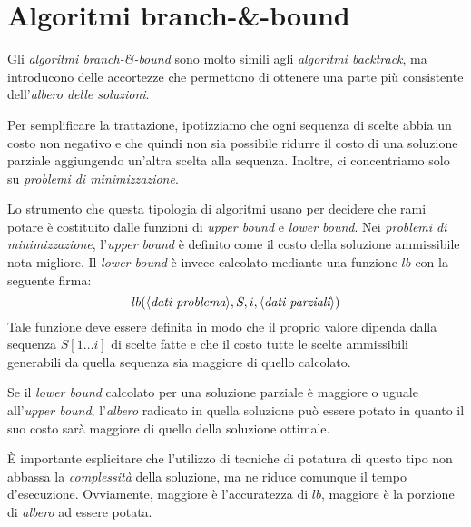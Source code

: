 \section{Algoritmi branch-\&-bound}
Gli \emph{algoritmi branch-\&-bound} sono molto simili agli \emph{algoritmi
backtrack}, ma introducono delle accortezze che permettono di ottenere
 una parte più consistente dell'\emph{albero delle soluzioni}.

\begin{note}
    Per semplificare la trattazione, ipotizziamo che ogni sequenza di scelte
    abbia un costo non negativo e che quindi non sia possibile ridurre il costo
    di una soluzione parziale aggiungendo un'altra scelta alla sequenza.
    Inoltre, ci concentriamo solo su \emph{problemi di minimizzazione}.
\end{note}

\noindent
Lo strumento che questa tipologia di algoritmi usano per decidere che rami potare
è costituito dalle funzioni di \emph{upper bound} e \emph{lower bound}. Nei
\emph{problemi di minimizzazione}, l'\emph{upper bound} è definito come il
costo della soluzione ammissibile nota migliore. Il \emph{lower bound} è invece
calcolato mediante una funzione $lb$ con la seguente firma:
\[lb(\langle\emph{dati problema}\rangle,S,i,\langle\emph{dati parziali}\rangle)\]
Tale funzione deve essere definita in modo che il proprio valore dipenda dalla
sequenza $S[1\dots i]$ di scelte fatte e che il costo tutte le scelte
ammissibili generabili da quella sequenza sia maggiore di quello calcolato.

Se il \emph{lower bound} calcolato per una soluzione parziale è maggiore o
uguale all'\emph{upper bound}, l'\emph{albero} radicato in quella soluzione può
essere potato in quanto il suo costo sarà maggiore di quello della soluzione
ottimale.

\begin{note}
    È importante esplicitare che l'utilizzo di tecniche di potatura di questo
    tipo non abbassa la \emph{complessità} della soluzione, ma ne riduce
    comunque il tempo d'esecuzione. Ovviamente, maggiore è l'accuratezza di
    $lb$, maggiore è la porzione di \emph{albero} ad essere potata.
\end{note}

